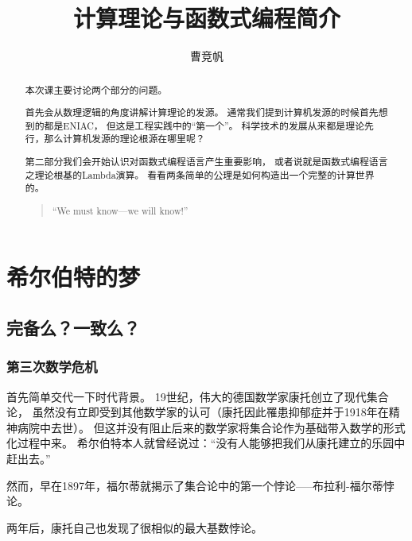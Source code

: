 \documentclass[12pt,a4paper,oneside]{ctexrep}
\title{计算理论与函数式编程简介}
\author{曹竞帆}
\theoremstyle{definition}
\begin{document}
\date{}
\maketitle

\begin{abstract}

本次课主要讨论两个部分的问题。

首先会从数理逻辑的角度讲解计算理论的发源。
通常我们提到计算机发源的时候首先想到的都是ENIAC，
但这是工程实践中的“第一个”。
科学技术的发展从来都是理论先行，那么计算机发源的理论根源在哪里呢？

第二部分我们会开始认识对函数式编程语言产生重要影响，
或者说就是函数式编程语言之理论根基的Lambda演算。
看看两条简单的公理是如何构造出一个完整的计算世界的。



\begin{quote}
``We must know---we will know!''
\end{quote}

\end{abstract}

\chapter{希尔伯特的梦}

\section{完备么？一致么？}

\subsection{第三次数学危机}

首先简单交代一下时代背景。
19世纪，伟大的德国数学家康托创立了现代集合论，
虽然没有立即受到其他数学家的认可（康托因此罹患抑郁症并于1918年在精神病院中去世）。
但这并没有阻止后来的数学家将集合论作为基础带入数学的形式化过程中来。
希尔伯特本人就曾经说过：“没有人能够把我们从康托建立的乐园中赶出去。”

然而，早在1897年，福尔蒂就揭示了集合论中的第一个悖论-----布拉利-福尔蒂悖论。

两年后，康托自己也发现了很相似的最大基数悖论。
\end{document}
